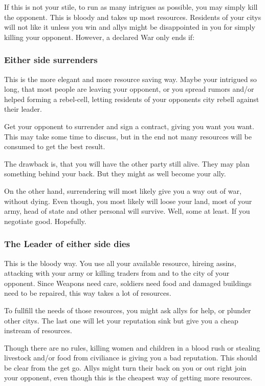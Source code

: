 \documentclass[10pt,twoside,twocolumn,openany]{book}
\begin{document}
If this is not your stile, to run as many intrigues as possible, you may simply kill the opponent. This is bloody and takes up most resources. Residents of your citys will not like it unless you win and allys might be disappointed in you for simply killing your opponent. However, a declared War only ends if:

\subsubsection{Either side surrenders}

This is the more elegant and more resource saving way. Maybe your intrigued so long, that most people are leaving your opponent, or you spread rumors and/or helped forming a rebel-cell, letting residents of your opponents city rebell against their leader.

Get your opponent to surrender and sign a contract, giving you want you want. This may take some time to discuss, but in the end not many resources will be consumed to get the best result.

The drawback is, that you will have the other party still alive. They may plan something behind your back. But they might as well become your ally.

On the other hand, surrendering will most likely give you a way out of war, without dying. Even though, you most likely will loose your land, most of your army, head of state and other personal will survive. Well, some at least. If you negotiate good. Hopefully.

\subsubsection{The Leader of either side dies} 

This is the bloody way. You use all your available resource, hireing assins, attacking with your army or killing traders from and to the city of your opponent. Since Weapons need care, soldiers need food and damaged buildings need to be repaired, this way takes a lot of resources.

To fullfill the needs of those resources, you might ask allys for help, or plunder other citys. The last one will let your reputation sink but give you a cheap instream of resources.

Though there are no rules, killing women and children in a blood rush or stealing livestock and/or food from civiliance is giving you a bad reputation. This should be clear from the get go. Allys might turn their back on you or out right join your opponent, even though this is the cheapest way of getting more resources.
\end{document}
